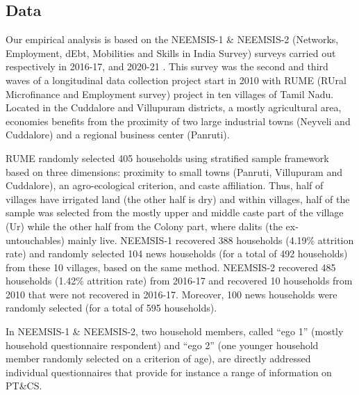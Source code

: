 \documentclass[a4paper, 11pt, onecolumn]{article}
\newcommand{\PTCS}{PT\&CS}
\begin{document}
	\subsection{Data}
	\label{subsection:data}

Our empirical analysis is based on the NEEMSIS-1 \& NEEMSIS-2 (Networks, Employment, dEbt, Mobilities and Skills in India Survey) surveys carried out respectively in 2016-17, and 2020-21 \citep{NEEMSISreport, NEEMSIS2017}.
This survey was the second and third waves of a longitudinal data collection project start in 2010 with RUME (RUral Microfinance and Employment survey) project in ten villages of Tamil Nadu.
Located in the Cuddalore and Villupuram districts, a mostly agricultural area, economies benefits from the proximity of two large industrial towns (Neyveli and Cuddalore) and a regional business center (Panruti).

RUME randomly selected 405 households using stratified sample framework based on three dimensions: proximity to small towns (Panruti, Villupuram and Cuddalore), an agro-ecological criterion, and caste affiliation.
Thus, half of villages have irrigated land (the other half is dry) and within villages, half of the sample was selected from the mostly upper and middle caste part of the village (Ur) while the other half from the Colony part, where dalits (the ex-untouchables)  mainly live. 
NEEMSIS-1 recovered 388 households (4.19\% attrition rate) and randomly selected 104 news households (for a total of 492 households) from these 10 villages, based on the same method. 
NEEMSIS-2 recovered 485 households (1.42\% attrition rate) from 2016-17 and recovered 10 households from 2010 that were not recovered in 2016-17.
Moreover, 100 news households were randomly selected (for a total of 595 households).

In NEEMSIS-1 \& NEEMSIS-2, two household members, called ``ego 1'' (mostly household questionnaire respondent) and ``ego 2'' (one younger household member randomly selected on a criterion of age), are directly addressed individual questionnaires that provide for instance a range of information on \PTCS.
\end{document}

